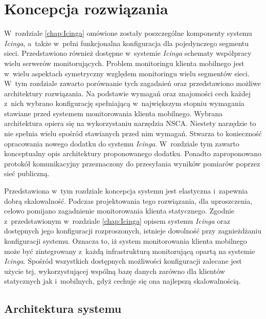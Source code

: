 \chapter{Koncepcja rozwiązania}
\label{chap:ProjektSystemu}

W~rozdziale \ref{chap:Icinga} omówione zostały poszczególne komponenty
systemu {\em Icinga}, a~także w~pełni funkcjonalna konfiguracja dla
pojedynczego segmentu sieci. Przedstawiono również dostępne w~systemie
{\em Icinga} schematy współpracy wielu serwerów
monitorujących. Problem monitoringu klienta mobilnego jest w~wielu
aspektach symetryczny względem monitoringu wielu segmentów sieci.
W~tym rozdziale zawarto porównanie tych zagadnień oraz przedstawiono
możliwe architektury rozwiązania. Na podstawie wymagań oraz znajomości
cech każdej z~nich wybrano konfigurację spełniającą w~największym
stopniu wymagania stawiane przed systemem monitorowania klienta
mobilnego. Wybrana architektura opiera się na wykorzystaniu narzędzia
NSCA. Niestety narzędzie to nie spełnia wielu spośród stawianych przed
nim wymagań. Stwarza to konieczność opracowania nowego dodatku do
systemu {\em Icinga}. W~rozdziale tym zawarto konceptualny opis
architektury proponowanego dodatku. Ponadto zaproponowano protokół
komunikacyjny przeznaczony do przesyłania wyników pomiarów poprzez
sieć publiczną.

Przedstawiona w~tym rozdziale koncepcja systemu jest elastyczna
i~zapewnia dobrą skalowalność. Podczas projektowania tego rozwiązania,
dla uproszczenia, celowo pomijano zagadnienie monitorowania klienta
statycznego. Zgodnie z~przedstawionym w~rozdziale \ref{chap:Icinga}
opisem systemu {\em Icinga} oraz dostępnych jego konfiguracji
rozproszonych, istnieje dowolność przy zagnieżdżaniu konfiguracji
systemu. Oznacza to, iż system monitorowania klienta mobilnego może
być zintegrowany z~każdą infrastrukturą monitorującą opartą na
systemie {\em Icinga}. Spośród wszystkich dostępnych możliwości
konfiguracji zalecane jest użycie tej, wykorzystującej wspólną bazę
danych zarówno dla klientów statycznych jak i~mobilnych, gdyż cechuje
się ona najlepszą skalowalnością.

\section[Architektura systemu][Architektura systemu]{Architektura
  systemu}

